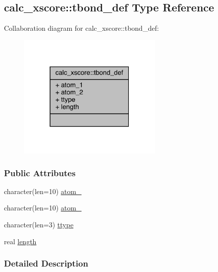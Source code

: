 \hypertarget{structcalc__xscore_1_1tbond__def}{\subsection{calc\-\_\-xscore\-:\-:tbond\-\_\-def Type Reference}
\label{structcalc__xscore_1_1tbond__def}
}


Collaboration diagram for calc\-\_\-xscore\-:\-:tbond\-\_\-def\-:
\nopagebreak
\begin{figure}[H]
\begin{center}
\leavevmode
\includegraphics[width=199pt]{structcalc__xscore_1_1tbond__def__coll__graph}
\end{center}
\end{figure}
\subsubsection*{Public Attributes}
\begin{DoxyCompactItemize}
\item 
character(len=10) \hyperlink{structcalc__xscore_1_1tbond__def_a5f8dfaea0e174b6dff6ad684a7929bd3}{atom\-\_}
\item 
character(len=10) \hyperlink{structcalc__xscore_1_1tbond__def_a790fc5d2038a9f1e17ec2423fd77b687}{atom\-\_}
\item 
character(len=3) \hyperlink{structcalc__xscore_1_1tbond__def_a605d49d7b0a488b81663c38e744f8464}{ttype}
\item 
real \hyperlink{structcalc__xscore_1_1tbond__def_ae468bd85b9bd983328b4b6ca91ffd270}{length}
\end{DoxyCompactItemize}


\subsubsection{Detailed Description}


